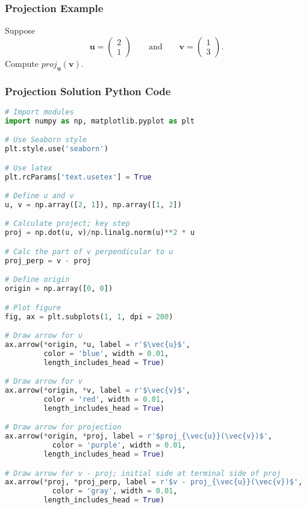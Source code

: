 \documentclass{beamer}
\begin{document}
\begin{frame}
\frametitle{Projection Example}

\begin{Example}
Suppose
$$
{\boldsymbol u} = \left(\begin{array}{c} 2\\ 1\end{array}\right)\qquad\text{and}\qquad {\boldsymbol v} = \left(\begin{array}{c} 1\\ 3\end{array}\right).
$$
Compute $proj_{\boldsymbol u}( {\boldsymbol v})$.
\end{Example}

\end{frame}

\begin{frame}[fragile]
\frametitle{Projection Solution Python Code}

\begin{multicols}{2}
\begin{lstlisting}[language=Python]
# Import modules
import numpy as np, matplotlib.pyplot as plt

# Use Seaborn style
plt.style.use('seaborn')

# Use latex
plt.rcParams['text.usetex'] = True

# Define u and v
u, v = np.array([2, 1]), np.array([1, 2])

# Calculate project; key step
proj = np.dot(u, v)/np.linalg.norm(u)**2 * u

# Calc the part of v perpendicular to u
proj_perp = v - proj

# Define origin
origin = np.array([0, 0])

# Plot figure
fig, ax = plt.subplots(1, 1, dpi = 200)

# Draw arrow for u
ax.arrow(*origin, *u, label = r'$\vec{u}$', 
         color = 'blue', width = 0.01, 
         length_includes_head = True)

# Draw arrow for v
ax.arrow(*origin, *v, label = r'$\vec{v}$', 
         color = 'red', width = 0.01, 
         length_includes_head = True)

# Draw arrow for projection
ax.arrow(*origin, *proj, label = r'$proj_{\vec{u}}(\vec{v})$', 
           color = 'purple', width = 0.01, 
         length_includes_head = True)

# Draw arrow for v - proj; initial side at terminal side of proj
ax.arrow(*proj, *proj_perp, label = r'$v - proj_{\vec{u}}(\vec{v})$', 
           color = 'gray', width = 0.01, 
         length_includes_head = True)


\end{lstlisting}
\end{multicols}
\end{frame}
\end{document}
